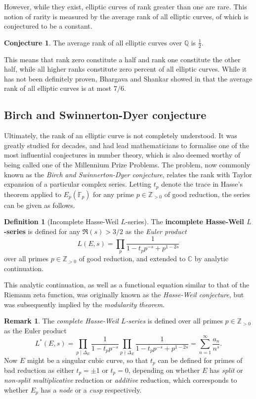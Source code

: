 \documentclass{article}
\newcommand{\F}{\mathbb{F}}
\newcommand{\Z}{\mathbb{Z}}
\newcommand{\Q}{\mathbb{Q}}
\newcommand{\C}{\mathbb{C}}
\newcommand{\rb}[1]{\left( #1 \right)}
\theoremstyle{definition}\newtheorem*{definition}{Definition}
\theoremstyle{definition}\newtheorem*{example}{Example}
\theoremstyle{definition}\newtheorem*{remark}{Remark}
\newtheorem{conjecture}[proposition]{Conjecture}
\begin{document}
However, while they exist, elliptic curves of rank greater than one are rare. This notion of rarity is measured by the average rank of all elliptic curves, of which is conjectured to be a constant.

\begin{conjecture}
The average rank of all elliptic curves over $ \Q $ is $ \tfrac{1}{2} $.
\end{conjecture}

This means that rank zero constitute a half and rank one constitute the other half, while all higher ranks constitute zero percent of all elliptic curves. While it has not been definitely proven, Bhargava and Shankar showed in \cite{rankaverage} that the average rank of all elliptic curves is at most $ 7 / 6 $.

\pagebreak

\subsection{Birch and Swinnerton-Dyer conjecture}

Ultimately, the rank of an elliptic curve is not completely understood. It was greatly studied for decades, and had lead mathematicians to formalise one of the most influential conjectures in number theory, which is also deemed worthy of being called one of the Millennium Prize Problems. The problem, now commonly known as the \emph{Birch and Swinnerton-Dyer conjecture}, relates the rank with Taylor expansion of a particular complex series. Letting $ t_p $ denote the trace in Hasse's theorem applied to $ E_p\rb{\F_p} $ for any prime $ p \in \Z_{> 0} $ of good reduction, the series can be given as follows.

\begin{definition}[Incomplete Hasse-Weil $ L $-series]
The \textbf{incomplete Hasse-Weil $ L $-series} is defined for any $ \Re\rb{s} > 3 / 2 $ as the \emph{Euler product}
$$ L\rb{E, s} = \prod_p \dfrac{1}{1 - t_pp^{-s} + p^{1 - 2s}} $$
over all primes $ p \in \Z_{> 0} $ of good reduction, and extended to $ \C $ by analytic continuation.
\end{definition}

This analytic continuation, as well as a functional equation similar to that of the Riemann zeta function, was originally known as the \emph{Hasse-Weil conjecture}, but was subsequently implied by the \emph{modularity theorem}.

\begin{remark}
The \emph{complete Hasse-Weil $ L $-series} is defined over all primes $ p \in \Z_{> 0} $ as the Euler product
$$ L^*\rb{E, s} = \prod_{p \mid \Delta_E} \dfrac{1}{1 - t_pp^{-s}} \prod_{p \nmid \Delta_E} \dfrac{1}{1 - t_pp^{-s} + p^{1 - 2s}} = \sum_{n = 1}^\infty \dfrac{a_n}{n^s}. $$
Now $ E $ might be a singular cubic curve, so that $ t_p $ can be defined for primes of bad reduction as either $ t_p = \pm 1 $ or $ t_p = 0 $, depending on whether $ E $ has \emph{split} or \emph{non-split multiplicative} reduction or \emph{additive} reduction, which corresponds to whether $ E_p $ has a \emph{node} or a \emph{cusp} respectively.
\end{remark}
\end{document}
